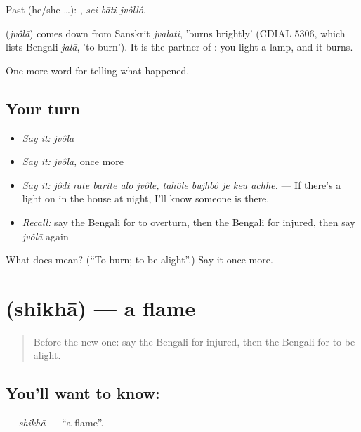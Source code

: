 Past (he/she …):   , \emph{sei bāti jvôllô}.

\begin{cousinweb}
\textbf{} (\emph{jvôlā}) comes down from Sanskrit \emph{jvalati}, 'burns brightly' (CDIAL 5306, which lists Bengali \emph{jalā}, 'to burn'). It is the partner of \textbf{}: you light a lamp, and it burns.
\end{cousinweb}

\begin{grammarlens}[title={What you've built}]
One more word for telling what happened.
\end{grammarlens}

\subsection*{Your turn}
\begin{itemize}
\raggedright
  \item \emph{Say it:} \emph{jvôlā}
  \item \emph{Say it:} \emph{jvôlā}, once more
  \item \emph{Say it:} \emph{jôdi rāte bāṛite ālo jvôle, tāhôle bujhbô je keu āchhe.} — If there's a light on in the house at night, I'll know someone is there.
  \item \emph{Recall:} say the Bengali for to overturn, then the Bengali for injured, then say \emph{jvôlā} again
\end{itemize}

\begin{tcolorbox}[breakable,colback=teal!4,colframe=teal!35!black,title={Before you move on}]
What does  mean? (\textquotedblleft{}To burn; to be alight\textquotedblright{}.) Say it once more.
\end{tcolorbox}
\section[\texorpdfstring{\bn{শিখা} (shikhā)}{শিখা (shikhā)}]{ (shikhā) — a flame}

\label{lesson:BN-C279-shikha}



\begin{quote}
Before the new one: say the Bengali for injured, then the Bengali for to be alight.
\end{quote}

\subsection*{You'll want to know: }
\textbf{} — \emph{shikhā} — \textquotedblleft{}a flame\textquotedblright{}.

